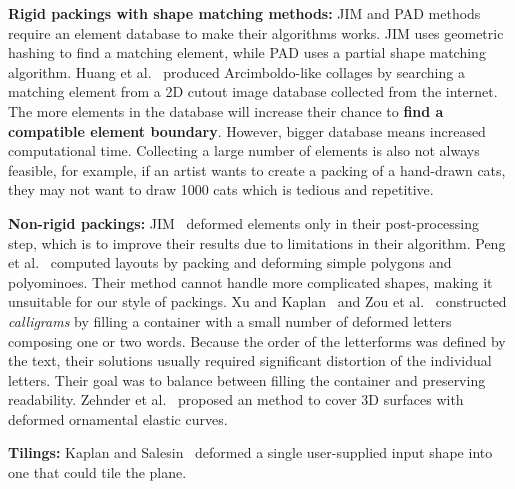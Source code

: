 \textbf{Rigid packings with shape matching methods:}
JIM and PAD methods require an element database to make their algorithms works.
JIM uses geometric hashing to find a matching element, 
while PAD uses a partial shape matching algorithm.
Huang et al.~\cite{Huang2011} produced Arcimboldo-like collages
by searching a matching element from a 2D cutout image database collected from the internet.  
The more elements in the database will increase their chance to \textbf{find a compatible element boundary}.
However, bigger database means increased computational time.
Collecting a large number of elements is also not always feasible,
for example, if an artist wants to create a packing of a hand-drawn cats,
they may not want to draw 1000 cats which is tedious and repetitive.

\textbf{Non-rigid packings:}
JIM~\cite{Kim2002} deformed elements
only in their post-processing step, which is to improve their results due to limitations in their algorithm.
Peng et al.~\cite{Peng2014} computed layouts by packing and deforming
simple polygons and polyominoes. Their method cannot handle more
complicated shapes, making it unsuitable for our style of packings.
Xu and Kaplan~\cite{Xu2007} and Zou et al.~\cite{Zou2016}
constructed \textit{calligrams} by filling a container with a small
number of deformed letters composing one or two words.  Because the
order of the letterforms was defined by the text, their solutions
usually required significant distortion of the individual letters.
Their goal was to balance between filling the container and preserving
readability.
Zehnder et al.~\cite{Zehnder2016} proposed an method to
cover 3D surfaces with deformed ornamental elastic curves.



\textbf{Tilings:}
Kaplan and Salesin~\cite{Kaplan2000} deformed a single user-supplied 
input shape into one that could tile the plane.

